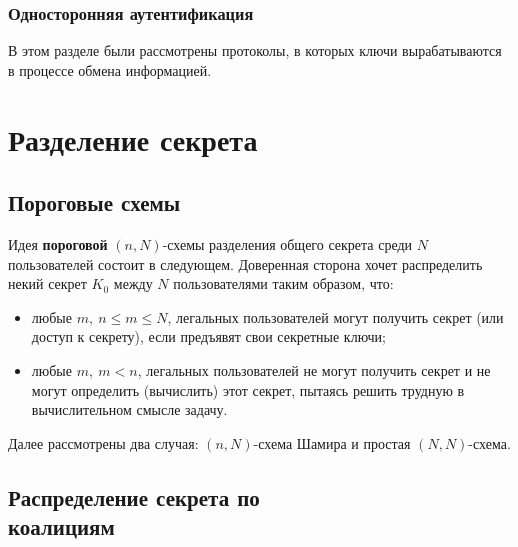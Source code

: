 \documentclass[10pt,a4paper]{book}
\begin{document}



\subsection{Односторонняя аутентификация}









В этом разделе были рассмотрены протоколы, в которых ключи вырабатываются в процессе обмена информацией.

\chapter{Разделение секрета}

\section{Пороговые схемы}

Идея \textbf{пороговой} $(n, N)$-схемы разделения общего секрета среди $N$ пользователей состоит в следующем.
Доверенная сторона хочет распределить некий секрет $K_0$ между $N$ пользователями таким образом, что:
\begin{itemize}
    \item любые $m, ~ n \le m \le N$,  легальных пользователей могут получить секрет (или доступ к секрету), если предъявят свои секретные ключи;
    \item любые $m, ~ m < n$, легальных пользователей не могут получить секрет и не могут определить (вычислить) этот секрет, пытаясь решить трудную в вычислительном смысле  задачу.
\end{itemize}

Далее рассмотрены два случая: $(n, N)$-схема Шамира и простая $(N,N)$-схема.





\section[Распределение секрета по коалициям]{Распределение секрета по \protect\\ коалициям}
\end{document}
